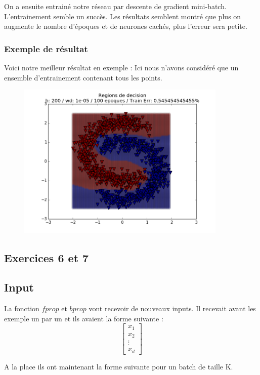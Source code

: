 \documentclass[a4paper,11pt]{article}
\begin{document}
On a ensuite entrainé notre réseau par descente de gradient mini-batch.
L'entrainement semble un succès.
Les résultats semblent montré que plus on augmente le nombre d'époques et de neurones cachés, plus l'erreur sera petite.

\subsubsection{Exemple de résultat}


Voici notre meilleur résultat en exemple :
Ici nous n'avons considéré que un ensemble d'entrainement contenant tous les points.

\begin{figure}[H]
	\includegraphics[width=10cm]{images/exo5-under1.png}
	\centering
	\label{fig:comp}
\end{figure}



\subsection{Exercices 6 et 7	}
\subsection{Input}

La fonction $fprop$ et $bprop$ vont recevoir de nouveaux inputs.
Il recevait avant les exemple un par un et ils avaient la forme suivante :
\[
\begin{bmatrix}
    x_{1}  \\
    x_{2}  \\
    \vdots  \\
    x_{d} 
\end{bmatrix}
\]

A la place ils ont maintenant la forme suivante pour un batch de taille K. 
\end{document}
